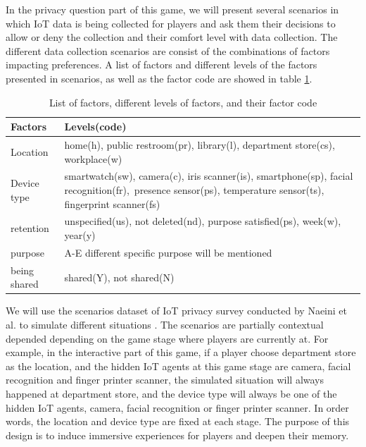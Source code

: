 \documentclass[a4paper,11pt]{article}
\begin{document}
In the privacy question part of this game, we will present several scenarios in which IoT data is being collected for players and ask them their decisions to allow or deny the collection and their comfort level with data collection. The different data collection scenarios are consist of the combinations of factors impacting preferences. A list of factors and different levels of the factors presented in scenarios, as well as the factor code are showed in table \ref{tab:factors}.

\begin{table}[tb]
\vskip 3mm
\begin{center}
\begin{adjustwidth}{0cm}{0cm}
\begin{tabular}{ |p{}| p{}|}
\hline
\textbf{Factors} & \textbf{Levels(code)}\\
\hline
Location    & home(h), public restroom(pr), library(l), department store(cs), workplace(w) \\
\hline
Device type & smartwatch(sw), camera(c), iris scanner(is), smartphone(sp), facial recognition(fr),\ presence sensor(ps), temperature sensor(ts), fingerprint scanner(fs)\\
\hline
retention & unspecified(us), not deleted(nd), purpose satisfied(ps), week(w), year(y)\\
\hline
purpose & A-E different specific purpose will be mentioned\\
\hline
being shared & shared(Y), not shared(N)\\

\hline
\end{tabular}
\end{adjustwidth}
\caption{List of factors, different levels of factors, and their factor code}
\label{tab:factors}
\end{center}
\vskip -3mm
\end{table}

We will use the scenarios dataset of IoT privacy survey conducted by Naeini et al. to simulate different situations \cite{Naeini:2017}. The scenarios are partially contextual depended depending on the game stage where players are currently at. For example, in the interactive part of this game, if a player choose department store as the location, and the hidden IoT agents at this game stage are camera, facial recognition and finger printer scanner, the simulated situation will always happened at department store, and the device type will always be one of the hidden IoT agents, camera, facial recognition or finger printer scanner. In order words, the location and device type are fixed at each stage. The purpose of this design is to induce immersive experiences for players and deepen their memory. 
\end{document}
